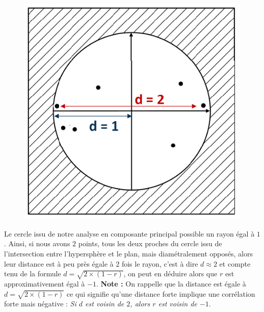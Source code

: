 \begin{figure}[H]\begin{center}\includegraphics[scale=0.5]{ilu/hyperProjd.png}\end{center}\end{figure}

Le cercle issu de notre analyse en composante principal possible un rayon égal à $1$. Ainsi, si nous avons $2$ points, tous les deux proches du cercle issu de l'intersection entre l'hypersphère et le plan, mais diamétralement opposés, alors leur distance est à peu près égale à $2$ fois le rayon, c'est à dire $d\approx 2$ et compte tenu de la formule $d = \sqrt{2\times(1-r)}$, on peut en déduire alors que $r$ est approximativement égal à $-1$.  \newline
\textbf{Note : } On rappelle que la distance est égale à $d = \sqrt{2\times(1-r)}$ ce qui signifie qu'une distance forte implique une corrélation forte mais négative : \textit{Si $d$ est voisin de $2$, alors $r$ est voisin de $-1$}.

